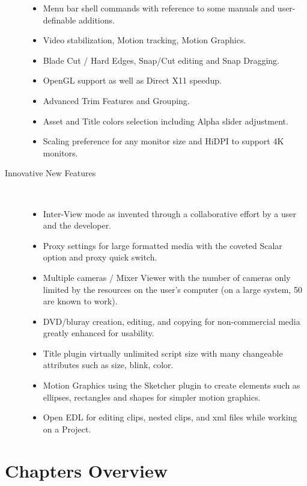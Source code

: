 \begin{description}
\begin{itemize}
                \item Menu bar shell commands with reference to some manuals and user-definable additions.
                \item Video stabilization, Motion tracking, Motion Graphics.
                \item Blade Cut / Hard Edges, Snap/Cut editing and Snap Dragging.
                \item OpenGL support as well as Direct X11 speedup.
                \item Advanced Trim Features and Grouping.
                \item Asset and Title colors selection including Alpha slider adjustment.
                \item Scaling preference for any monitor size and HiDPI to support 4K monitors.
            \end{itemize}
            \item[Innovative New Features] ~\\
                \begin{itemize}
                    \item Inter-View mode as invented through a collaborative effort by a user and the developer.
                    \item Proxy settings for large formatted media with the coveted Scalar option and proxy quick switch.
                    \item Multiple cameras / Mixer Viewer with the number of cameras only limited by the resources on the user’s computer (on a large system, 50 are known to work).
                    \item DVD/bluray creation, editing, and copying for non-commercial media greatly enhanced for usability.
                    \item Title plugin virtually unlimited script size with many changeable attributes such as size, blink, color.
                    \item Motion Graphics using the Sketcher plugin to create elements such as ellipses, rectangles and shapes for simpler motion graphics.
                    \item Open EDL for editing clips, nested clips, and xml files while working on a Project.
                \end{itemize}
\end{description}

\section*{Chapters Overview}%
\label{sec:chapters_overview}

